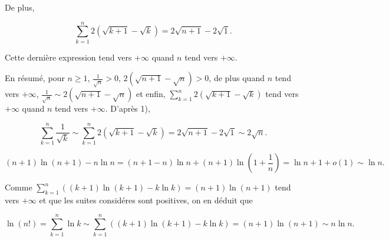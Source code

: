 {\begin{enumerate}
{De plus, 

$$\sum_{k=1}^{n}2(\sqrt{k+1}-\sqrt{k})=2\sqrt{n+1}-2\sqrt{1}.$$

Cette dernière expression tend vers $+\infty$ quand $n$ tend vers $+\infty$.

En résumé, pour $n\geq1$, $\frac{1}{\sqrt{n}}>0$, $2(\sqrt{n+1}-\sqrt{n})>0$, de plus quand $n$ tend vers $+\infty$, 
$\frac{1}{\sqrt{n}}\sim2(\sqrt{n+1}-\sqrt{n})$ et enfin, $\sum_{k=1}^{n}2(\sqrt{k+1}-\sqrt{k})$ tend vers $+\infty$ quand $n$ tend vers $+\infty$. D'après 1),

$$\sum_{k=1}^{n}\frac{1}{\sqrt{k}}\sim\sum_{k=1}^{n}2(\sqrt{k+1}-\sqrt{k})=2\sqrt{n+1}-2\sqrt{1}\sim2\sqrt{n}.$$

$$(n+1)\ln(n+1)-n\ln n=(n+1-n)\ln n+(n+1)\ln(1+\frac{1}{n})=\ln n+1+o(1)\sim\ln n.$$

Comme $\sum_{k=1}^{n}((k+1)\ln(k+1)-k\ln k)=(n+1)\ln(n+1)$ tend vers $+\infty$ et que les suites considéres sont positives, on en déduit que 

$$\ln(n!)=\sum_{k=1}^{n}\ln k\sim\sum_{k=1}^{n}((k+1)\ln(k+1)-k\ln k)=(n+1)\ln(n+1)\sim n\ln n.$$}
\end{enumerate}
}
